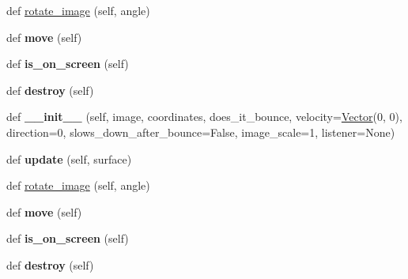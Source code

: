 \begin{DoxyCompactItemize}
\item 
def \hyperlink{classMovingObject_1_1MovingObject_ac2299da57e4ff40983ed385c33ac4c63}{rotate\+\_\+image} (self, angle)
\item 
def {\bfseries move} (self)\hypertarget{classMovingObject_1_1MovingObject_a6060cd55441bc6f9473c4ad5520adc8c}{}\label{classMovingObject_1_1MovingObject_a6060cd55441bc6f9473c4ad5520adc8c}

\item 
def {\bfseries is\+\_\+on\+\_\+screen} (self)\hypertarget{classMovingObject_1_1MovingObject_a3c44ea1a39ee9bd15bb16295a7f6bf75}{}\label{classMovingObject_1_1MovingObject_a3c44ea1a39ee9bd15bb16295a7f6bf75}

\item 
def {\bfseries destroy} (self)\hypertarget{classMovingObject_1_1MovingObject_a7deae65ed90400dab791e8611e86c833}{}\label{classMovingObject_1_1MovingObject_a7deae65ed90400dab791e8611e86c833}

\item 
def {\bfseries \+\_\+\+\_\+init\+\_\+\+\_\+} (self, image, coordinates, does\+\_\+it\+\_\+bounce, velocity=\hyperlink{classVector_1_1Vector}{Vector}(0, 0), direction=0, slows\+\_\+down\+\_\+after\+\_\+bounce=False, image\+\_\+scale=1, listener=None)\hypertarget{classMovingObject_1_1MovingObject_a237013581377a7e5f7163d47254dbce8}{}\label{classMovingObject_1_1MovingObject_a237013581377a7e5f7163d47254dbce8}

\item 
def {\bfseries update} (self, surface)\hypertarget{classMovingObject_1_1MovingObject_ab8d51c9a7e120afad47200b6166d2530}{}\label{classMovingObject_1_1MovingObject_ab8d51c9a7e120afad47200b6166d2530}

\item 
def \hyperlink{classMovingObject_1_1MovingObject_ac2299da57e4ff40983ed385c33ac4c63}{rotate\+\_\+image} (self, angle)
\item 
def {\bfseries move} (self)\hypertarget{classMovingObject_1_1MovingObject_a6060cd55441bc6f9473c4ad5520adc8c}{}\label{classMovingObject_1_1MovingObject_a6060cd55441bc6f9473c4ad5520adc8c}

\item 
def {\bfseries is\+\_\+on\+\_\+screen} (self)\hypertarget{classMovingObject_1_1MovingObject_a3c44ea1a39ee9bd15bb16295a7f6bf75}{}\label{classMovingObject_1_1MovingObject_a3c44ea1a39ee9bd15bb16295a7f6bf75}

\item 
def {\bfseries destroy} (self)\hypertarget{classMovingObject_1_1MovingObject_a7deae65ed90400dab791e8611e86c833}{}\label{classMovingObject_1_1MovingObject_a7deae65ed90400dab791e8611e86c833}

\end{DoxyCompactItemize}
